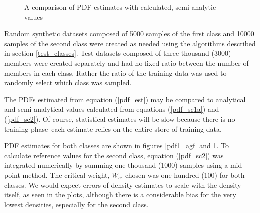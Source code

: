 \begin{figure}
  \caption{A comparison of PDF estimates with calculated, semi-analytic values}
  \label{pdf2_agf}
\end{figure}

Random synthetic datasets composed of 5000 samples of the first class
and 10000 samples of the second class were created as needed
using the algorithms described in section \ref{test_classes}.
Test datasets composed of three-thousand (3000) members
were created separately and had no fixed ratio
between the number of members in each class.  Rather the
ratio of the training data was used to randomly select which
class was sampled.

The PDFs estimated from equation (\ref{pdf_est}) may 
be compared to analytical and semi-analytical values calculated
from equations (\ref{pdf_sc1a}) and (\ref{pdf_sc2}).
Of course, statistical estimates will be slow because there
is no training phase--each estimate relies on the entire store
of training data.

PDF estimates for both classes are shown in figures \ref{pdf1_agf}
and \ref{pdf2_agf}.  To calculate reference values for the second
class, equation (\ref{pdf_sc2}) was integrated numerically by
summing one-thousand (1000) samples using a mid-point method.
The critical weight, $W_c$, chosen was one-hundred (100) for both
classes.
We would expect errors
of density estimates to scale with the density itself, 
as seen in the plots, although there is a considerable bias for
the very lowest densities, especially for the second class.

